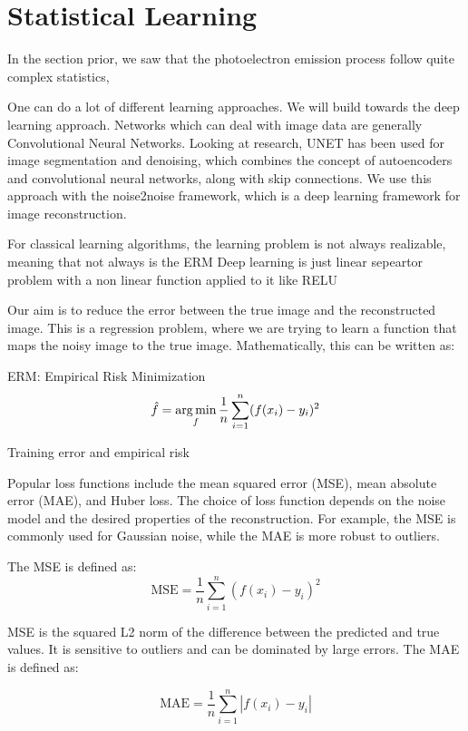 \section{Statistical Learning}
In the section prior, we saw that the photoelectron emission process follow quite complex statistics, 

One can do a lot of different learning approaches. We will build towards the deep learning approach. Networks which can deal with image data are generally Convolutional Neural Networks. Looking at research, UNET has been used for image segmentation and denoising, which combines the concept of autoencoders and convolutional neural networks, along with skip connections.
We use this approach with the noise2noise framework, which is a deep learning framework for image reconstruction.

For classical learning algorithms, the learning problem is not always realizable, meaning that not always is the 
ERM 
Deep learning is just linear sepeartor problem with a non linear function applied to it like RELU

Our aim is to reduce the error between the true image and the reconstructed image. This is a regression problem, where we are trying to learn a function that maps the noisy image to the true image. Mathematically, this can be written as:

ERM: Empirical Risk Minimization
\begin{equation}
    \hat{f} = \operatorname*{arg\,min}_f \frac{1}{n} \sum_{i=1}^{n} (f(x_i) - y_i)^{2}
\end{equation}

Training error and empirical risk 

Popular loss functions include the mean squared error (MSE), mean absolute error (MAE), and Huber loss. The choice of loss function depends on the noise model and the desired properties of the reconstruction. For example, the MSE is commonly used for Gaussian noise, while the MAE is more robust to outliers.

The MSE is defined as:
\begin{equation}
    \text{MSE} = \frac{1}{n} \sum_{i=1}^{n} (f(x_i) - y_i)^{2}
\end{equation}

MSE is the squared L2 norm of the difference between the predicted and true values. It is sensitive to outliers and can be dominated by large errors. The MAE is defined as:

\begin{equation}
    \text{MAE} = \frac{1}{n} \sum_{i=1}^{n} \left| f(x_i) - y_i \right|
\end{equation}

